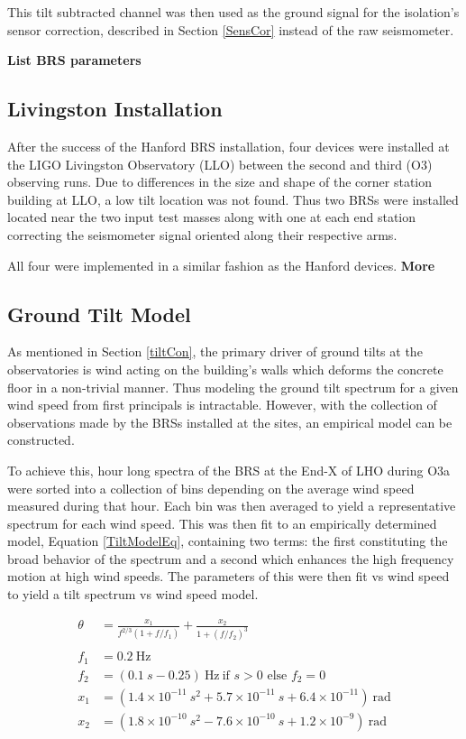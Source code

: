 \documentclass [12pt, proquest]{uwthesis}[2019]
\begin{document}
This tilt subtracted channel was then used as the ground signal for the isolation's sensor correction, described in Section \ref{SensCor} instead of the raw seismometer.

\textbf{List BRS parameters}


\subsection{Livingston Installation}

\quad After the success of the Hanford BRS installation, four devices were installed at the LIGO Livingston Observatory (LLO) between the second and third (O3) observing runs. Due to differences in the size and shape of the corner station building at LLO, a low tilt location was not found. Thus two BRSs were installed located near the two input test masses along with one at each end station correcting the seismometer signal oriented along their respective arms. 

All four were implemented in a similar fashion as the Hanford devices. \textbf{More}

\subsection{Ground Tilt Model}

As mentioned in Section \ref{tiltCon}, the primary driver of ground tilts at the observatories is wind acting on the building's walls which deforms the concrete floor in a non-trivial manner. Thus modeling the ground tilt spectrum for a given wind speed from first principals is intractable. However, with the collection of observations made by the BRSs installed at the sites, an empirical model can be constructed.

To achieve this, hour long spectra of the BRS at the End-X of LHO during O3a were sorted into a collection of bins depending on the average wind speed measured during that hour. Each bin was then averaged to yield a representative spectrum for each wind speed. This was then fit to an empirically determined model, Equation \ref{TiltModelEq}, containing two terms: the first constituting the broad behavior of the spectrum and a second which enhances the high frequency motion at high wind speeds. The parameters of this were then fit vs wind speed to yield a tilt spectrum vs wind speed model. 

\begin{align}
\theta&=\frac{x_1}{f^{2/3}(1+f/f_1)} +\frac{x_2}{1+(f/f_2)^3}\label{TiltModelEq}\\
\nonumber \\ 
f_1&=0.2\ \text{Hz}\nonumber \\
f_2&=(0.1\ s -0.25)\ \text{Hz}\ \text{if }s>0\text{ else }f_2=0\nonumber \\
x_1&=(1.4\times10^{-11}\ s^2+5.7\times10^{-11}\ s+6.4\times10^{-11})\ \text{rad}\nonumber \\
x_2&=(1.8\times10^{-10}\ s^2-7.6\times10^{-10}\ s+1.2\times10^{-9})\ \text{rad}\nonumber
\end{align}
\end{document}
